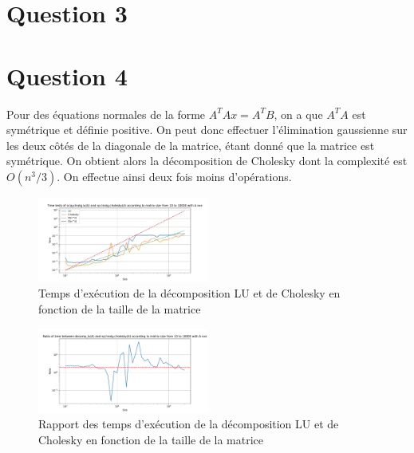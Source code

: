 \documentclass[11pt]{article}
\begin{document}
\section*{Question 3}

\section*{Question 4}
Pour des équations normales de la forme $A^T A x = A^T B$, on a que $A^T A$ est symétrique et définie positive. 
On peut donc effectuer l'élimination gaussienne sur les deux côtés de la diagonale de la matrice, étant donné que la matrice est symétrique.
On obtient alors la décomposition de Cholesky dont la complexité est $O(n^3/3)$. On effectue ainsi deux fois moins d'opérations.

\begin{figure}[h]
\centering
\includegraphics[width=0.5\textwidth]{images/lu_cholesky_time_tests.pdf}
\caption{Temps d'exécution de la décomposition LU et de Cholesky en fonction de la taille de la matrice}
\end{figure}

\begin{figure}[h]
\centering
\includegraphics[width=0.5\textwidth]{images/lu_cholesky_ratio.pdf}
\caption{Rapport des temps d'exécution de la décomposition LU et de Cholesky en fonction de la taille de la matrice}

\end{figure}
\end{document}
